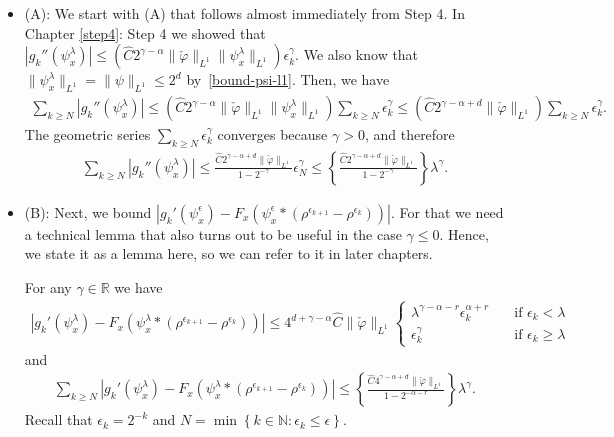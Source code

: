 \begin{itemize}
    \item (A): We start with (A) that follows almost immediately from Step 4. In Chapter \ref{step4}: Step 4 we showed that \(|g_k''(\psi^{\lambda}_x)| 
    {\leq}  \left(\hat C  2^{\gamma - \alpha} \lVert \check \varphi \rVert_{L^1} \lVert \psi^{\lambda}_x \rVert_{L^1}\right) \epsilon_k^\gamma\). We also know that \(\lVert \psi^\lambda_x \rVert_{L^1} = \lVert \psi \rVert_{L^1} \leq 2^d\) by~\eqref{bound-psi-l1}. Then, we have
    \begin{align*}
        \sum_{k \geq N} |g_k''(\psi^{\lambda}_x)|  \leq 
        \left(\hat C  2^{\gamma - \alpha} \lVert \check \varphi \rVert_{L^1} \lVert \psi^{\lambda}_x \rVert_{L^1}\right) \sum_{k \geq N}  \epsilon_k^\gamma 
        \leq \left(\hat C  2^{\gamma - \alpha + d} \lVert \check \varphi \rVert_{L^1} \right) \sum_{k \geq N}  \epsilon_k^\gamma.
    \end{align*}
    The geometric series \(\sum\limits_{k \geq N}  \epsilon_k^\gamma\) converges because \(\gamma > 0\), and therefore
    \begin{align*}
        \sum_{k \geq N} |g_k''(\psi^{\lambda}_x)| \leq 
        \frac{\hat C  2^{\gamma - \alpha + d} \lVert \check \varphi \rVert_{L^1}}{1-2^{-\gamma}} \epsilon_N^{\gamma}
        \leq
        \left\{\frac{\hat C  2^{\gamma - \alpha + d} \lVert \check \varphi \rVert_{L^1}}{1-2^{-\gamma}}\right\} \lambda^{\gamma}.
    \end{align*}
 
    \item (B): Next, we bound \(|g_k'(\psi^\epsilon_x) - F_x(\psi^\epsilon_x * (\rho^{\epsilon_{k+1}} - \rho^{\epsilon_k}))|\). For that we need a technical lemma that also turns out to be useful in the case \(\gamma \leq 0\). Hence, we state it as a lemma here, so we can refer to it in later chapters.
    

    \begin{lemma}\label{technical-lemma-2}
        For any \(\gamma \in \mathbb{R}\) we have 
        \begin{align*}
            |g_k'(\psi^\lambda_x) - F_x(\psi^\lambda_x * (\rho^{\epsilon_{k+1}} - \rho^{\epsilon_k}))| \leq 4^{d + \gamma - \alpha} \hat C \lVert \check \varphi \rVert_{L^1} \begin{cases}
                \lambda^{\gamma - \alpha - r} \epsilon_k^{\alpha + r}  \quad &\text{if \(\epsilon_k < \lambda\) }\\
                \epsilon_k^\gamma & \text{if \(\epsilon_k \geq \lambda\) }
            \end{cases}
        \end{align*}
        and 
        \begin{align*}
            \sum_{k \geq N} |g_k'(\psi^\lambda_x) - F_x(\psi^\lambda_x * (\rho^{\epsilon_{k+1}} - \rho^{\epsilon_k}))|
            \leq
            \left \{ \frac{\hat C 4^{\gamma - \alpha + d} \lVert \check \varphi \rVert_{L^1} }{1-2^{-\alpha - r}} \right \} \lambda^{\gamma}.
        \end{align*}
        Recall that \(\epsilon_k = 2^{-k}\) and \(N = \min\left\{ k \in \mathbb{N}: \epsilon_k \leq \epsilon \right\}\).
    \end{lemma}


\end{itemize}
